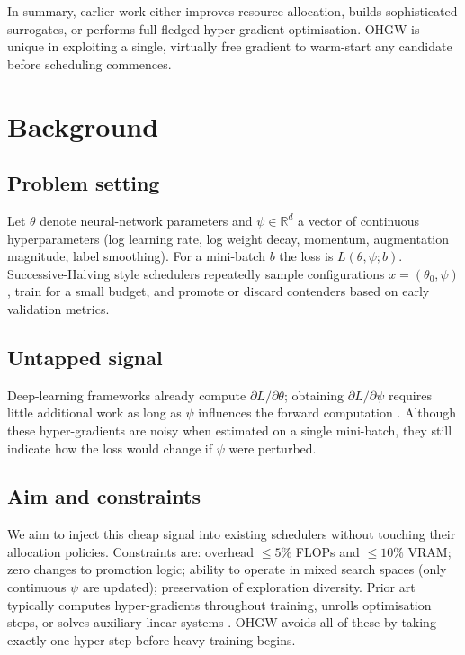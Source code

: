 \documentclass{article}
\begin{document}
In summary, earlier work either improves resource allocation, builds sophisticated surrogates, or performs full-fledged hyper-gradient optimisation. OHGW is unique in exploiting a single, virtually free gradient to warm-start any candidate before scheduling commences.

\section{Background}
\subsection{Problem setting}
Let \(\theta\) denote neural-network parameters and \(\psi\in\mathbb{R}^d\) a vector of continuous hyperparameters (log learning rate, log weight decay, momentum, augmentation magnitude, label smoothing). For a mini-batch \(b\) the loss is \(L(\theta,\psi; b)\). Successive-Halving style schedulers repeatedly sample configurations \(x=(\theta_0,\psi)\), train for a small budget, and promote or discard contenders based on early validation metrics.

\subsection{Untapped signal}
Deep-learning frameworks already compute \(\partial L/\partial \theta\); obtaining \(\partial L/\partial \psi\) requires little additional work as long as \(\psi\) influences the forward computation \cite{chandra-2019-gradient}. Although these hyper-gradients are noisy when estimated on a single mini-batch, they still indicate how the loss would change if \(\psi\) were perturbed.

\subsection{Aim and constraints}
We aim to inject this cheap signal into existing schedulers without touching their allocation policies. Constraints are: overhead \(\leq 5 \%\) FLOPs and \(\leq 10 \%\) VRAM; zero changes to promotion logic; ability to operate in mixed search spaces (only continuous \(\psi\) are updated); preservation of exploration diversity. Prior art typically computes hyper-gradients throughout training, unrolls optimisation steps, or solves auxiliary linear systems \cite{bertrand-2020-implicit,immer-2023-stochastic}. OHGW avoids all of these by taking exactly one hyper-step before heavy training begins.
\end{document}
